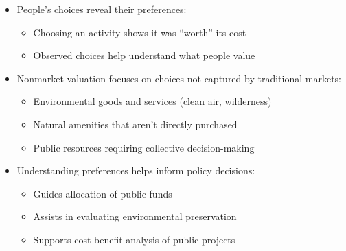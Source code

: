 \documentclass[
  ignorenonframetext,
]{beamer}
\providecommand{\tightlist}{%
  \setlength{\itemsep}{0pt}\setlength{\parskip}{0pt}}\usepackage{longtable,booktabs,array}
\begin{document}
\begin{frame}
\begin{itemize}
\tightlist
\item
  People's choices reveal their preferences:

  \begin{itemize}
  \tightlist
  \item
    Choosing an activity shows it was ``worth'' its cost
  \item
    Observed choices help understand what people value
  \end{itemize}
\item
  Nonmarket valuation focuses on choices not captured by traditional
  markets:

  \begin{itemize}
  \tightlist
  \item
    Environmental goods and services (clean air, wilderness)
  \item
    Natural amenities that aren't directly purchased
  \item
    Public resources requiring collective decision-making
  \end{itemize}
\item
  Understanding preferences helps inform policy decisions:

  \begin{itemize}
  \tightlist
  \item
    Guides allocation of public funds
  \item
    Assists in evaluating environmental preservation
  \item
    Supports cost-benefit analysis of public projects
  \end{itemize}
\end{itemize}
\end{frame}
\end{document}
